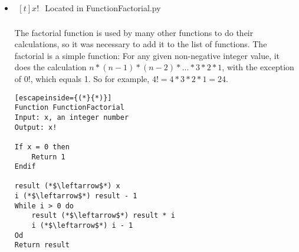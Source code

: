 \begin{itemize}
            \begin{center}
                $tanh(x) = \frac{sinh(x)}{cosh(x)}$
            \end{center}

            \begin{lstlisting}[escapeinside={(*}{*)}]
Function FunctionTanh
Input: x, a real number and isDeg, a boolean
Output: Tanh(num)

If isDeg is True then:
    num (*$\leftarrow$*) degreeToRadians(x)
Endif

num1 (*$\leftarrow$*) FunctionSinh(num)
num2 (*$\leftarrow$*) FunctionCosh(num)
return num1/num2
            \end{lstlisting}

            \paragraph{}
            The algorithm for this function takes 2 parameters: the number “num” to compute and an optional boolean parameter “isDeg” specifying if the input x passed in is in degrees or not. If the boolean isDeg is true, the algorithm first converts the inputted number into radians before calculating. Then, we calculate Sinh(num) and Cosh(num) and store the results in “num1” and “num2” respectively.  Finally we divide “num1” by “num2” to get the result.

        \item $\begin{aligned}[t]
            x!
        \end{aligned}$
            Located in FunctionFactorial.py

            \paragraph{}
            The factorial function is used by many other functions to do their calculations, so it was necessary to add it to the list of functions. The factorial is a simple function: For any given non-negative integer value, it does the calculation $n*(n-1)*(n-2)*...*3*2*1$, with the exception of $0!$, which equals 1. So for example, $4! = 4*3*2*1 = 24$.

            \begin{lstlisting}[escapeinside={(*}{*)}]
Function FunctionFactorial
Input: x, an integer number
Output: x!

If x = 0 then
	Return 1
Endif

result (*$\leftarrow$*) x
i (*$\leftarrow$*) result - 1
While i > 0 do
	result (*$\leftarrow$*) result * i
	i (*$\leftarrow$*) i - 1
Od
Return result
            \end{lstlisting}


\end{itemize}
